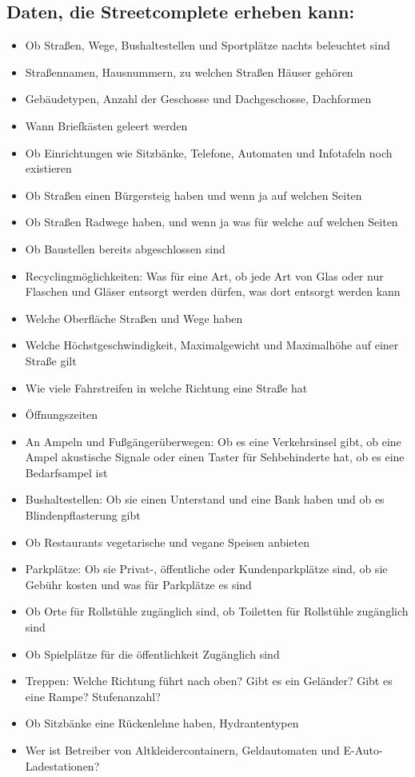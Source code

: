 \documentclass[10pt,foldmark,notumble]{leaflet}
\begin{document}
    \subsection{Daten, die Streetcomplete erheben kann:}
    \begin{itemize}[noitemsep,topsep=0pt]
        \small
        \item Ob Straßen, Wege, Bushaltestellen und Sportplätze nachts beleuchtet sind
        \item Straßennamen, Hausnummern, zu welchen Straßen Häuser gehören
        \item Gebäudetypen, Anzahl der Geschosse und Dachgeschosse, Dachformen
        \item Wann Briefkästen geleert werden
        \item Ob Einrichtungen wie Sitzbänke, Telefone, Automaten und Infotafeln noch existieren
        \item Ob Straßen einen Bürgersteig haben und wenn ja auf welchen Seiten
        \item Ob Straßen Radwege haben, und wenn ja was für welche auf welchen Seiten
        \item Ob Baustellen bereits abgeschlossen sind
        \item Recyclingmöglichkeiten: Was für eine Art, ob jede Art von Glas oder nur Flaschen und Gläser entsorgt werden dürfen, was dort entsorgt werden kann
        \item Welche Oberfläche Straßen und Wege haben
        \item Welche Höchstgeschwindigkeit, Maximalgewicht und Maximalhöhe auf einer Straße gilt
        \item Wie viele Fahrstreifen in welche Richtung eine Straße hat
        \item Öffnungszeiten
        \item An Ampeln und Fußgängerüberwegen: Ob es eine Verkehrsinsel gibt, ob eine Ampel akustische Signale oder einen Taster für Sehbehinderte hat, ob es eine Bedarfsampel ist
        \item Bushaltestellen: Ob sie einen Unterstand und eine Bank haben und ob es Blindenpflasterung gibt
        \item Ob Restaurants vegetarische und vegane Speisen anbieten
        \item Parkplätze: Ob sie Privat-, öffentliche oder Kundenparkplätze sind, ob sie Gebühr kosten und was für Parkplätze es sind
        \item Ob Orte für Rollstühle zugänglich sind, ob Toiletten für Rollstühle zugänglich sind
        \item Ob Spielplätze für die öffentlichkeit Zugänglich sind
        \item Treppen: Welche Richtung führt nach oben? Gibt es ein Geländer? Gibt es eine Rampe? Stufenanzahl?
        \item Ob Sitzbänke eine Rückenlehne haben, Hydrantentypen
        \item Wer ist Betreiber von Altkleidercontainern, Geldautomaten und E-Auto-Ladestationen?
    \end{itemize}
\end{document}
